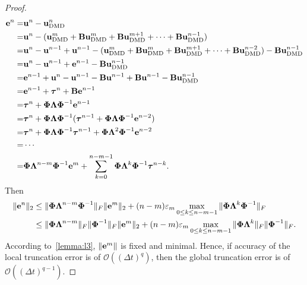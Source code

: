 \documentclass[10pt]{article}
\numberwithin{equation}{section}
\theoremstyle{plain}
\theoremstyle{remark}
\theoremstyle{remark}
\begin{document}
\begin{proof}
\begin{equation}\label{eq:3-15}
\begin{aligned}
\bold e^n =& \bold u^n-\bold u_\text{DMD}^n\\
=&\bold u^n-(\bold u_\text{DMD}^m+\bold B\bold u_\text{DMD}^m+\bold B\bold u_\text{DMD}^{m+1}+\cdots+\bold B\bold u_\text{DMD}^{n-1})\\
=&\bold u^n-\bold u^{n-1}+\bold u^{n-1}-(\bold u_\text{DMD}^m+\bold B\bold u_\text{DMD}^m+\bold B\bold u_\text{DMD}^{m+1}+\cdots+\bold B\bold u_\text{DMD}^{n-2}) 
-\bold B\bold u_\text{DMD}^{n-1}\\
=&\bold u^n-\bold u^{n-1}+\bold e^{n-1}-\bold B\bold u_\text{DMD}^{n-1}\\
=&\bold e^{n-1}+\bold u^n-\bold u^{n-1}-\bold B\bold u^{n-1}+\bold B\bold u^{n-1}-\bold B\bold u_\text{DMD}^{n-1}\\
=&\bold e^{n-1}+\boldsymbol \tau^{n}+\bold B\bold e^{n-1}\\
=&\boldsymbol \tau^n+\boldsymbol\Phi\boldsymbol\Lambda\boldsymbol\Phi^{-1}\bold e^{n-1}\\
=&\boldsymbol \tau^n+\boldsymbol\Phi\boldsymbol\Lambda\boldsymbol\Phi^{-1} (\boldsymbol \tau^{n-1}+\boldsymbol\Phi\boldsymbol\Lambda\boldsymbol\Phi^{-1}\bold e^{n-2})\\
=&\boldsymbol \tau^n+\boldsymbol\Phi\boldsymbol\Lambda\boldsymbol\Phi^{-1}\boldsymbol \tau^{n-1}+\boldsymbol\Phi\boldsymbol\Lambda^2\boldsymbol\Phi^{-1}\bold e^{n-2}\\
=&\cdots\\
=&\boldsymbol\Phi\boldsymbol\Lambda^{n-m}\boldsymbol\Phi^{-1}\bold e^m+\sum_{k=0}^{n-m-1}\boldsymbol\Phi\boldsymbol\Lambda^k\boldsymbol\Phi^{-1}\boldsymbol \tau^{n-k}.
\end{aligned}
\end{equation}
Then 
\begin{equation}\label{eq:3-16}
\begin{aligned}
\|\bold e^n\|_2&\leq \|\boldsymbol\Phi\boldsymbol\Lambda^{n-m}\boldsymbol\Phi^{-1}\|_F\|\bold e^m\|_2+(n-m)\varepsilon_m\max_{0\leq k\leq n-m-1}\|\boldsymbol\Phi\boldsymbol\Lambda^k\boldsymbol\Phi^{-1}\|_F\\
&\leq  \|\boldsymbol\Phi\boldsymbol\Lambda^{n-m}\|_F\|\boldsymbol\Phi^{-1}\|_F\|\bold e^m\|_2+(n-m)\varepsilon_m\max_{0\leq k\leq n-m-1}\|\boldsymbol\Phi\boldsymbol\Lambda^k\|_F\|\boldsymbol\Phi^{-1}\|_F.
\end{aligned}
\end{equation}
According to~\cref{lemma:l3}, $\|\bold e^m\|$ is fixed and minimal. Hence, if accuracy of the local truncation error is of $\mathcal O((\Delta t)^q)$, then the global truncation error is of $\mathcal O((\Delta t)^{q-1})$.
\end{proof}
\end{document}
